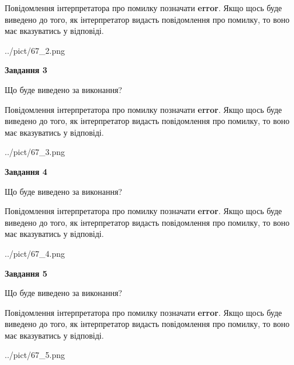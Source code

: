\documentclass[12pt, ukrainian]{article}
\begin{document}
{\begin {large}
Повідомлення інтерпретатора про помилку позначати \textbf{error}.
Якщо щось буде виведено до того, як інтерпретатор видасть повідомлення про помилку, 
то воно має вказуватись у відповіді. \par


\begin{center}
	{../pict/67_2.png}
\end{center}
\newpage

{\begin {center}\textbf{Завдання 3}\end {center}}\par
Що буде виведено за виконання?

Повідомлення інтерпретатора про помилку позначати \textbf{error}.
Якщо щось буде виведено до того, як інтерпретатор видасть повідомлення про помилку, 
то воно має вказуватись у відповіді. \par


\begin{center}
	{../pict/67_3.png}
\end{center}
\newpage

{\begin {center}\textbf{Завдання 4}\end {center}}\par
Що буде виведено за виконання?

Повідомлення інтерпретатора про помилку позначати \textbf{error}.
Якщо щось буде виведено до того, як інтерпретатор видасть повідомлення про помилку, 
то воно має вказуватись у відповіді. \par


\begin{center}
	{../pict/67_4.png}
\end{center}
\newpage

{\begin {center}\textbf{Завдання 5}\end {center}}\par
Що буде виведено за виконання?

Повідомлення інтерпретатора про помилку позначати \textbf{error}.
Якщо щось буде виведено до того, як інтерпретатор видасть повідомлення про помилку, 
то воно має вказуватись у відповіді. \par


\begin{center}
	{../pict/67_5.png}
\end{center}
\newpage


\end{large}}
\end{document}
